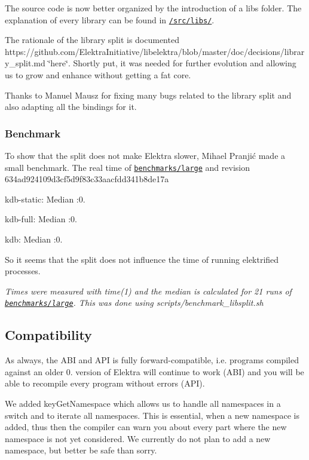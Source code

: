 The source code is now better organized by the introduction of a {\ttfamily libs} folder. The explanation of every library can be found in \href{https://github.com/ElektraInitiative/libelektra/tree/master/src/libs}{\tt /src/libs/}.

The rationale of the library split is documented https\+://github.com/\+Elektra\+Initiative/libelektra/blob/master/doc/decisions/library\+\_\+split.\+md \char`\"{}here\char`\"{}. Shortly put, it was needed for further evolution and allowing us to grow and enhance without getting a fat core.

Thanks to Manuel Mausz for fixing many bugs related to the library split and also adapting all the bindings for it.

\subsubsection*{Benchmark}

To show that the split does not make Elektra slower, Mihael Pranjić made a small benchmark. The real time of \href{/home/markus/Projekte/Elektra/current/benchmarks/large.c}{\tt benchmarks/large} and revision 634ad924109d3cf5d9f83c33aacfdd341b8de17a


\begin{DoxyEnumerate}
\item kdb-\/static\+: Median \+:0.
\item kdb-\/full\+: Median \+:0.
\item kdb\+: Median \+:0.
\end{DoxyEnumerate}

So it seems that the split does not influence the time of running elektrified processes.

{\itshape Times were measured with time(1) and the median is calculated for 21 runs of \href{/home/markus/Projekte/Elektra/current/benchmarks/large.c}{\tt benchmarks/large}. This was done using scripts/benchmark\+\_\+libsplit.sh}

\subsection*{Compatibility}

As always, the A\+B\+I and A\+P\+I is fully forward-\/compatible, i.\+e. programs compiled against an older 0. version of Elektra will continue to work (A\+B\+I) and you will be able to recompile every program without errors (A\+P\+I).

We added {\ttfamily key\+Get\+Namespace} which allows us to handle all namespaces in a switch and to iterate all namespaces. This is essential, when a new namespace is added, thus then the compiler can warn you about every part where the new namespace is not yet considered. We currently do not plan to add a new namespace, but better be safe than sorry.

